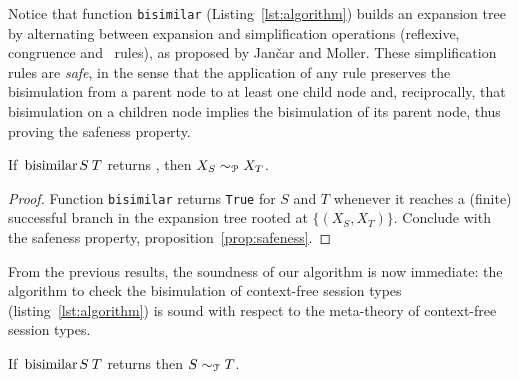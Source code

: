 Notice that function \lstinline|bisimilar|
(Listing~\ref{lst:algorithm}) builds an expansion tree by alternating
between expansion and simplification operations (reflexive,
congruence and \BPA\ rules), as proposed by Jan{\v{c}}ar and Moller.
%
These simplification rules are \emph{safe}, in the sense that the
application of any rule preserves the bisimulation from a parent node
to at least one child node and, reciprocally, that bisimulation on a
children node implies the bisimulation of its parent node, thus proving
the safeness property.


\begin{lemma}
  \label{lem:bisimilar-to-prod}
  If $\bisimf S T$ returns , then
  $X_{S} \sim_\mathcal P X_{T}$.
\end{lemma}

\begin{proof}
  Function \lstinline|bisimilar| returns \lstinline|True| for $S$ and
  $T$ whenever it reaches a (finite) successful branch in the expansion
  tree rooted at $\{(X_{S}, X_{T})\}$. Conclude with the safeness property,
  proposition~\ref{prop:safeness}.
\end{proof}

From the previous results, the soundness of our algorithm is now
immediate: the algorithm to check the bisimulation of context-free
session types (listing~\ref{lst:algorithm}) is sound with respect to
the meta-theory of context-free session types.

\begin{theorem}
  If $\bisimf ST$ returns  then $S\sim_\mathcal T T$.
\end{theorem}

